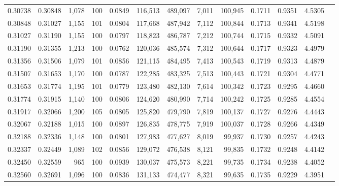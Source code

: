 \begin{tabular}{rrrrrrrrrrrrr}
0.30738 & 0.30848 & 1,078 & 100 &                                     0.0849 & 116,513 & 489,097 &   7,011 & 100,945 & 0.1711 & 0.9351 & 4.5305 \\
0.30848 & 0.31027 & 1,155 & 101 &                                     0.0804 & 117,668 & 487,942 &   7,112 & 100,844 & 0.1713 & 0.9341 & 4.5198 \\
0.31027 & 0.31190 & 1,155 & 100 &                                     0.0797 & 118,823 & 486,787 &   7,212 & 100,744 & 0.1715 & 0.9332 & 4.5091 \\
0.31190 & 0.31355 & 1,213 & 100 &                                     0.0762 & 120,036 & 485,574 &   7,312 & 100,644 & 0.1717 & 0.9323 & 4.4979 \\
0.31356 & 0.31506 & 1,079 & 101 &                                     0.0856 & 121,115 & 484,495 &   7,413 & 100,543 & 0.1719 & 0.9313 & 4.4879 \\
0.31507 & 0.31653 & 1,170 & 100 &                                     0.0787 & 122,285 & 483,325 &   7,513 & 100,443 & 0.1721 & 0.9304 & 4.4771 \\
0.31653 & 0.31774 & 1,195 & 101 &                                     0.0779 & 123,480 & 482,130 &   7,614 & 100,342 & 0.1723 & 0.9295 & 4.4660 \\
0.31774 & 0.31915 & 1,140 & 100 &                                     0.0806 & 124,620 & 480,990 &   7,714 & 100,242 & 0.1725 & 0.9285 & 4.4554 \\
0.31917 & 0.32066 & 1,200 & 105 &                                     0.0805 & 125,820 & 479,790 &   7,819 & 100,137 & 0.1727 & 0.9276 & 4.4443 \\
0.32067 & 0.32188 & 1,015 & 100 &                                     0.0897 & 126,835 & 478,775 &   7,919 & 100,037 & 0.1728 & 0.9266 & 4.4349 \\
0.32188 & 0.32336 & 1,148 & 100 &                                     0.0801 & 127,983 & 477,627 &   8,019 &  99,937 & 0.1730 & 0.9257 & 4.4243 \\
0.32337 & 0.32449 & 1,089 & 102 &                                     0.0856 & 129,072 & 476,538 &   8,121 &  99,835 & 0.1732 & 0.9248 & 4.4142 \\
0.32450 & 0.32559 &   965 & 100 &                                     0.0939 & 130,037 & 475,573 &   8,221 &  99,735 & 0.1734 & 0.9238 & 4.4052 \\
0.32560 & 0.32691 & 1,096 & 100 &                                     0.0836 & 131,133 & 474,477 &   8,321 &  99,635 & 0.1735 & 0.9229 & 4.3951 \\

\end{tabular}
